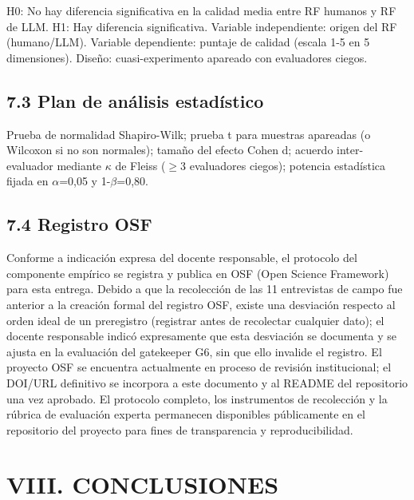 H0: No hay diferencia significativa en la calidad media entre RF humanos y RF de LLM. H1: Hay diferencia significativa. Variable independiente: origen del RF (humano/LLM). Variable dependiente: puntaje de calidad (escala 1-5 en 5 dimensiones). Diseño: cuasi-experimento apareado con evaluadores ciegos.


\subsection*{7.3 Plan de análisis estadístico}


Prueba de normalidad Shapiro-Wilk; prueba t para muestras apareadas (o Wilcoxon si no son normales); tamaño del efecto Cohen d; acuerdo inter-evaluador mediante $\kappa$ de Fleiss ($\geq$3 evaluadores ciegos); potencia estadística fijada en $\alpha$=0,05 y 1-$\beta$=0,80.


\subsection*{7.4 Registro OSF}


Conforme a indicación expresa del docente responsable, el protocolo del componente empírico se registra y publica en OSF (Open Science Framework) para esta entrega. Debido a que la recolección de las 11 entrevistas de campo fue anterior a la creación formal del registro OSF, existe una desviación respecto al orden ideal de un preregistro (registrar antes de recolectar cualquier dato); el docente responsable indicó expresamente que esta desviación se documenta y se ajusta en la evaluación del gatekeeper G6, sin que ello invalide el registro. El proyecto OSF se encuentra actualmente en proceso de revisión institucional; el DOI/URL definitivo se incorpora a este documento y al README del repositorio una vez aprobado. El protocolo completo, los instrumentos de recolección y la rúbrica de evaluación experta permanecen disponibles públicamente en el repositorio del proyecto para fines de transparencia y reproducibilidad.


\section*{VIII. CONCLUSIONES}


